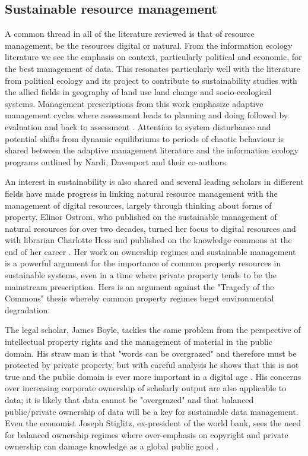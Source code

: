 \subsection{Sustainable resource management}

A common thread in all of the literature reviewed is that of resource management, be the resources digital or natural. From the information ecology literature we see the emphasis on context, particularly political and economic, for the best management of data. This resonates particularly well with the literature from political ecology and its project to contribute to sustainability studies with the allied fields in geography of land use land change and socio-ecological systems. Management prescriptions from this work emphasize adaptive management cycles where assessment leads to planning and doing followed by evaluation and back to assessment \citep{holling_1978,liu_etal_2007}. Attention to system disturbance and potential shifts from dynamic equilibriums to periods of chaotic behaviour is shared between the adaptive management literature and the information ecology programs outlined by Nardi, Davenport and their co-authors. 

An interest in sustainability is also shared and several leading scholars in different fields have made progress in linking natural resource management with the management of digital resources, largely through thinking about forms of property. Elinor Ostrom, who published on the sustainable management of natural resources for over two decades, turned her focus to digital resources and with librarian Charlotte Hess and published on the knowledge commons at the end of her career \citep{hess_2006}. Her work on ownership regimes and sustainable management is a powerful argument for the importance of common property resources in sustainable systems, even in a time where private property tends to be the mainstream prescription. Hers is an argument against the "Tragedy of the Commons" thesis whereby common property regimes beget environmental degradation.

The legal scholar, James Boyle, tackles the same problem from the perspective of intellectual property rights and the management of material in the public domain. His straw man is that "words can be overgrazed" and therefore must be protected by private property, but with careful analysis he shows that this is not true and the public domain is ever more important in a digital age \citep[][footnote 15 on p. 5]{boyle_2003}. His concerns over increasing corporate ownership of scholarly output are also applicable to data; it is likely that data cannot be "overgrazed" and that balanced public/private ownership of data will be a key for sustainable data management. Even the economist Joseph Stiglitz, ex-president of the world bank, sees the need for balanced ownership regimes where over-emphasis on copyright and private ownership can damage knowledge as a global public good \citep{stiglitz_1999}.

